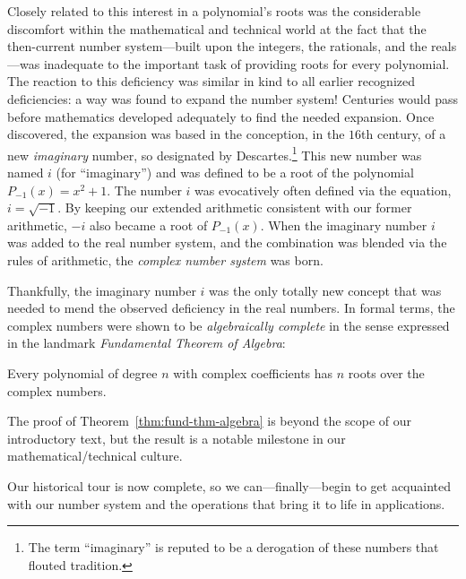 Closely related to this interest in a polynomial's roots was the
considerable discomfort within the mathematical and technical world at
the fact that the then-current number system---built upon the
integers, the rationals, and the reals---was inadequate to the
important task of providing roots for every polynomial.  The reaction
to this deficiency was similar in kind to all earlier recognized
deficiencies: a way was found to expand the number system!  Centuries
would pass before mathematics developed adequately to find the needed
expansion.  Once discovered, the expansion was based in the
conception, in the $16$th century, of a new {\it imaginary} number,
 so designated by 
Descartes.\footnote{The term ``imaginary'' is reputed to be a
  derogation of these numbers that flouted tradition.}  This new
number was named $i$  (for
``imaginary'') and was defined to be a root of the polynomial
$P_{-1}(x) = x^2 +1$.  The number $i$ was evocatively often defined
via the equation, $i = \sqrt{-1}$.  By keeping our extended arithmetic
consistent with our former arithmetic, $-i$ also became a root of
$P_{-1}(x)$.  When the imaginary number $i$ was added to the real
number system, and the combination was blended via the rules of
arithmetic, the {\it complex number system} was
born.

Thankfully, the imaginary number $i$ was the only totally new concept
that was needed to mend the observed deficiency in the real numbers.
In formal terms, the complex numbers were shown to be {\it
  algebraically complete}  in the sense expressed in the landmark {\it Fundamental
  Theorem of Algebra}: 

\begin{theorem}
\label{thm:fund-thm-algebra}
Every polynomial of degree $n$ with complex coefficients has $n$ roots
over the complex numbers.
\end{theorem}

The proof of Theorem~\ref{thm:fund-thm-algebra} is beyond the scope of
our introductory text, but the result is a notable milestone in our
mathematical/technical culture.

\medskip

Our historical tour is now complete, so we can---finally---begin to
get acquainted with our number system and the operations that bring it
to life in applications.

